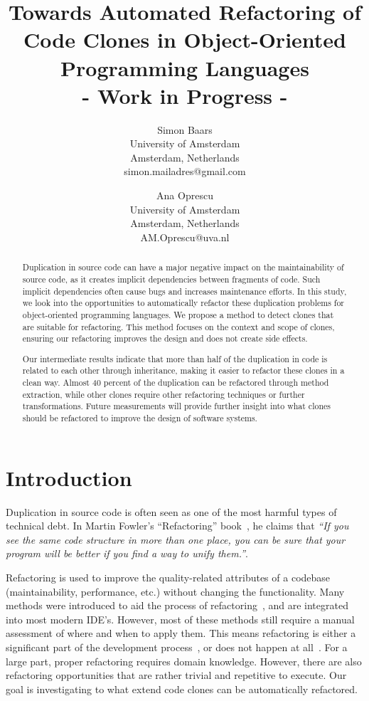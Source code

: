 \documentclass[a4paper]{article}
\title{Towards Automated Refactoring of Code Clones in Object-Oriented Programming Languages\\- Work in Progress -}
\author{
Simon Baars \\ University of Amsterdam\\
                Amsterdam, Netherlands \\ simon.mailadres@gmail.com
\and
Ana Oprescu \\ University of Amsterdam\\
                Amsterdam, Netherlands \\
                AM.Oprescu@uva.nl
}
\begin{document}
\maketitle

\begin{abstract}
Duplication in source code can have a major negative impact on the maintainability of source code, as it creates implicit dependencies between fragments of code. Such implicit dependencies often cause bugs and increases maintenance efforts. In this study, we look into the opportunities to automatically refactor these duplication problems for object-oriented programming languages. We propose a method to detect clones that are suitable for refactoring. This method focuses on the context and scope of clones, ensuring our refactoring improves the design and does not create side effects.

Our intermediate results indicate that more than half of the duplication in code is related to each other through inheritance, making it easier to refactor these clones in a clean way. Almost 40 percent of the duplication can be refactored through method extraction, while other clones require other refactoring techniques or further transformations. Future measurements will provide further insight into what clones should be refactored to improve the design of software systems.
\end{abstract}

\section{Introduction}
Duplication in source code is often seen as one of the most harmful types of technical debt. In Martin Fowler's ``Refactoring'' book~\cite{fowler1999refactoring}, he claims that \textit{``If you see the same code structure in more than one place, you can be sure that your program will be better if you find a way to unify them.''}.

Refactoring is used to improve the quality-related attributes of a codebase (maintainability, performance, etc.) without changing the functionality. Many methods were introduced to aid the process of refactoring~\cite{fowler1999refactoring, wake2004refactoring}, and are integrated into most modern IDE's. However, most of these methods still require a manual assessment of where and when to apply them. This means refactoring is either a significant part of the development process~\cite{lientz1978characteristics, mens2004survey}, or does not happen at all~\cite{mens2003refactoring}. For a large part, proper refactoring requires domain knowledge. However, there are also refactoring opportunities that are rather trivial and repetitive to execute. Our goal is investigating to what extend code clones can be automatically refactored.
\end{document}
